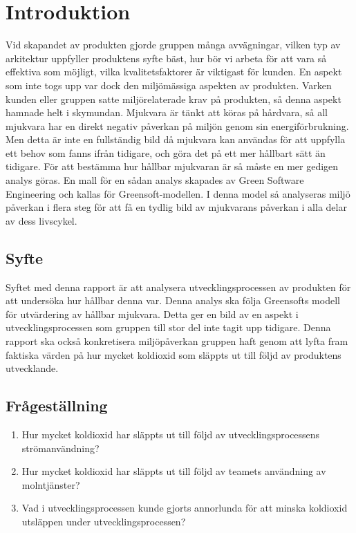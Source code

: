 \section{Introduktion}
\label{sec:joel_a-introduction}
Vid skapandet av produkten gjorde gruppen många avvägningar, vilken typ av arkitektur uppfyller produktens syfte bäst, hur bör vi arbeta för att vara så effektiva som möjligt, vilka kvalitetsfaktorer är viktigast för kunden. En aspekt som inte togs upp var dock den miljömässiga aspekten av produkten. Varken kunden eller gruppen satte miljörelaterade krav på produkten, så denna aspekt hamnade helt i skymundan. Mjukvara är tänkt att köras på hårdvara, så all mjukvara har en direkt negativ påverkan på miljön genom sin energiförbrukning. Men detta är inte en fullständig bild då mjukvara kan användas för att uppfylla ett behov som fanns ifrån tidigare, och göra det på ett mer hållbart sätt än tidigare. För att bestämma hur hållbar mjukvaran är så måste en mer gedigen analys göras. En mall för en sådan analys skapades av Green Software Engineering och kallas för Greensoft-modellen\cite{greensoft}. I denna model så analyseras miljö påverkan i flera steg för att få en tydlig bild av mjukvarans påverkan i alla delar av dess livscykel.

\subsection{Syfte}
Syftet med denna rapport är att analysera utvecklingsprocessen av produkten för att undersöka hur hållbar denna var. Denna analys ska följa Greensofts modell för utvärdering av hållbar mjukvara. Detta ger en bild av en aspekt i utvecklingsprocessen som gruppen till stor del inte tagit upp tidigare. Denna rapport ska också konkretisera miljöpåverkan gruppen haft genom att lyfta fram faktiska värden på hur mycket koldioxid som släppts ut till följd av produktens utvecklande.

\subsection{Frågeställning}
\label{subsec:joel_a-research-questions}

\begin{enumerate}

\item Hur mycket koldioxid har släppts ut till följd av utvecklingsprocessens strömanvändning?

\item Hur mycket koldioxid har släppts ut till följd av teamets användning av molntjänster?

\item Vad i utvecklingsprocessen kunde gjorts annorlunda för att minska koldioxid utsläppen under utvecklingsprocessen?

\end{enumerate}

